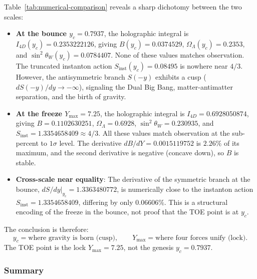 \documentclass[12pt,oneside,openany]{book}
\begin{document}
Table~\ref{tab:numerical-comparison} reveals a sharp dichotomy between the two scales:

\begin{itemize}
\item \textbf{At the bounce $y_c = 0.7937$}, the holographic integral is $I_{4D}(y_c) = 0.2353222126$, giving $B(y_c) = 0.0374529$, $\Omega_\Lambda(y_c) = 0.2353$, and $\sin^2\theta_W(y_c) = 0.0784407$. None of these values matches observation. The truncated instanton action $S_{\mathrm{inst}}(y_c) = 0.08495$ is nowhere near $4/3$. However, the antisymmetric branch $S(-y)$ exhibits a cusp ($dS(-y)/dy \to -\infty$), signaling the Dual Big Bang, matter-antimatter separation, and the birth of gravity.

\item \textbf{At the freeze $Y_{\max} = 7.25$}, the holographic integral is $I_{4D} = 0.6928050874$, giving $B = 0.1102630251$, $\Omega_\Lambda = 0.6928$, $\sin^2\theta_W = 0.230935$, and $S_{\mathrm{inst}} = 1.3354658409 \approx 4/3$. All these values match observation at the sub-percent to $1\sigma$ level. The derivative $dB/dY = 0.0015119752$ is $2.26\%$ of its maximum, and the second derivative is negative (concave down), so $B$ is stable.

\item \textbf{Cross-scale near equality}: The derivative of the symmetric branch at the bounce, $dS/dy|_{y_c} = 1.3363480772$, is numerically close to the instanton action $S_{\mathrm{inst}} = 1.3354658409$, differing by only $0.06606\%$. This is a structural encoding of the freeze in the bounce, not proof that the TOE point is at $y_c$.
\end{itemize}

The conclusion is therefore:
\begin{equation}
\boxed{y_c = \text{where gravity is born (cusp)}, \qquad Y_{\max} = \text{where four forces unify (lock)}.}
\label{eq:genesis-lock-table}
\end{equation}
The TOE point is the lock $Y_{\max} = 7.25$, not the genesis $y_c = 0.7937$.

\subsubsection{Summary}
\end{document}
